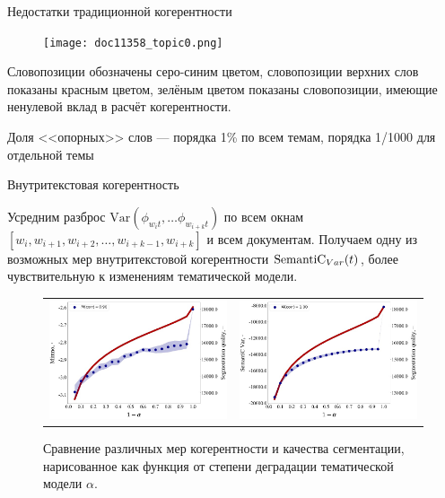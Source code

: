 \begin{frame}[t]{Недостатки традиционной когерентности}

\begin{figure}
        \texttt{[image: doc11358\_topic0.png]} %
\end{figure}
\vspace{-7pt}
Словопозиции обозначены серо-синим цветом, словопозиции верхних слов показаны красным цветом, зелёным цветом показаны словопозиции, имеющие ненулевой вклад в расчёт когерентности.

Доля <<опорных>> слов --- порядка 1\% по всем темам, порядка 1/1000 для отдельной темы

\end{frame}
\begin{frame}[t]{Внутритекстовая когерентность}%

\small{
Усредним разброс $\mathrm{Var}(\phi_{w_i t}, \dots \phi_{w_{i+k} t})$ по всем окнам $[w_i, w_{i+1}, w_{i+2}, \dots, w_{i+k-1}, w_{i+k}]$ и всем документам. Получаем одну из возможных мер внутритекстовой когерентности $\textup{SemantiC}_{Var}(t)$, более чувствительную к изменениям тематической модели.
} \vspace{-7pt}
\begin{figure}
\begin{tabular}{cc}
\setlength\tabcolsep{0pt} %
 \includegraphics[width=54mm]{images/segm_newman.png}  &   \includegraphics[width=54mm]{images/segm_var.png} 
\end{tabular}
    \caption{Сравнение различных мер когерентности и качества сегментации, нарисованное как функция от степени деградации тематической модели $\alpha$. }
\end{figure}
\end{frame}

